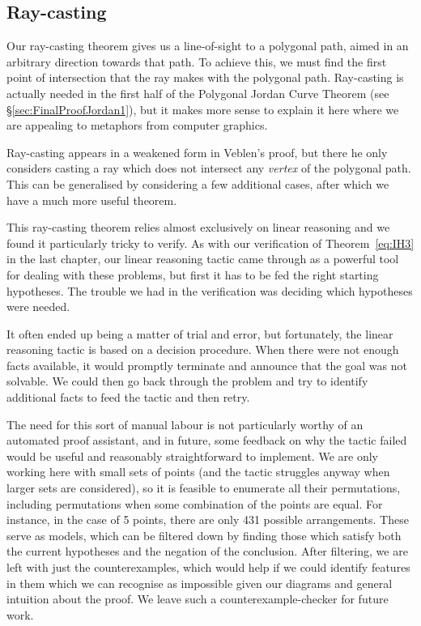 \subsection{Ray-casting}\label{sec:RayCasting}
Our ray-casting theorem gives us a line-of-sight to a polygonal path, aimed in an arbitrary direction towards that path. To achieve this, we must find the first point of intersection that the ray makes with the polygonal path. Ray-casting is actually needed in the first half of the Polygonal Jordan Curve Theorem (see \S\ref{sec:FinalProofJordan1}), but it makes more sense to explain it here where we are appealing to metaphors from computer graphics.

Ray-casting appears in a weakened form in Veblen's proof, but there he only considers casting a ray which does not intersect any \emph{vertex} of the polygonal path. This can be generalised by considering a few additional cases, after which we have a much more useful theorem.

This ray-casting theorem relies almost exclusively on linear reasoning and we found it particularly tricky to verify. As with our verification of Theorem~\ref{eq:IH3} in the last chapter, our linear reasoning tactic came through as a powerful tool for dealing with these problems, but first it has to be fed the right starting hypotheses. The trouble we had in the verification was deciding which hypotheses were needed. 

It often ended up being a matter of trial and error, but fortunately, the linear reasoning tactic is based on a decision procedure. When there were not enough facts available, it would promptly terminate and announce that the goal was not solvable. We could then go back through the problem and try to identify additional facts to feed the tactic and then retry. 

The need for this sort of manual labour is not particularly worthy of an automated proof assistant, and in future, some feedback on why the tactic failed would be useful and reasonably straightforward to implement. We are only working here with small sets of points (and the tactic struggles anyway when larger sets are considered), so it is feasible to enumerate all their permutations, including permutations when some combination of the points are equal. For instance, in the case of 5 points, there are only 431 possible arrangements. These serve as models, which can be filtered down by finding those which satisfy both the current hypotheses and the negation of the conclusion. After filtering, we are left with just the counterexamples, which would help if we could identify features in them which we can recognise as impossible given our diagrams and general intuition about the proof. We leave such a counterexample-checker for future work.

